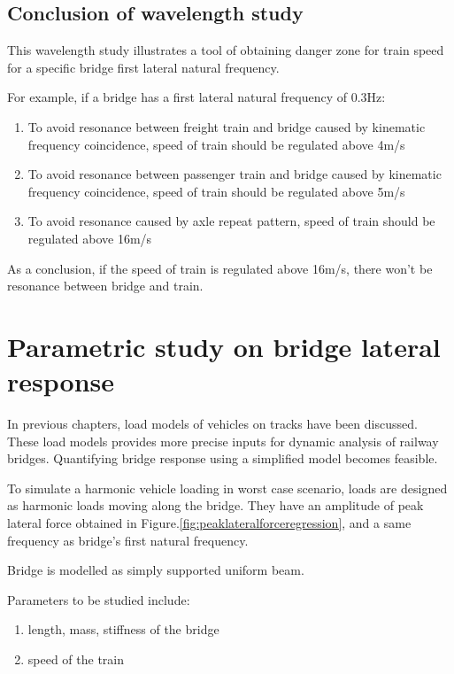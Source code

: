 \section{Conclusion of wavelength study}

This wavelength study illustrates a tool of obtaining danger zone for train speed for a specific bridge first lateral natural frequency. 

For example, if a bridge has a first lateral natural frequency of 0.3Hz:

\begin{enumerate}
\item To avoid resonance between freight train and bridge caused by kinematic frequency coincidence, speed of train should be regulated above 4m/s

\item To avoid resonance between passenger train and bridge caused by kinematic frequency coincidence, speed of train should be regulated above 5m/s

\item To avoid resonance caused by axle repeat pattern, speed of train should be regulated above 16m/s

\end{enumerate}

As a conclusion, if the speed of train is regulated above 16m/s, there won't be resonance between bridge and train.


\chapter{Parametric study on bridge lateral response}
In previous chapters, load models of vehicles on tracks have been discussed. These load models provides more precise inputs for dynamic analysis of railway bridges. Quantifying bridge response using a simplified model becomes feasible.

To simulate a harmonic vehicle loading in worst case scenario, loads are designed as harmonic loads moving along the bridge. They have an amplitude of peak lateral force obtained in Figure.\ref{fig:peaklateralforceregression}, and a same frequency as bridge's first natural frequency. 

Bridge is modelled as simply supported uniform beam.

Parameters to be studied include:

\begin{enumerate}[-]
    \item length, mass, stiffness of the bridge
    \item speed of the train
\end{enumerate}
 
